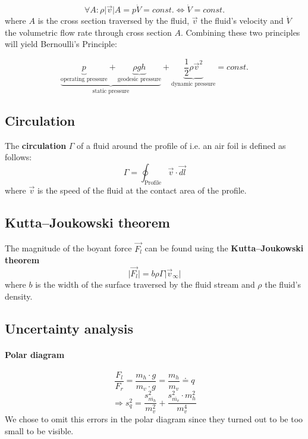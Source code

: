 \documentclass{scrreprt}
\begin{document}
\begin{equation}
\forall A : \rho \lvert \vec{v}\rvert A = p \dot{V} = const. \Longleftrightarrow \dot{V} = const.
\end{equation}
where $A$ is the cross section traversed by the fluid, $\vec{v}$ the fluid's velocity and $\dot{V}$ the volumetric flow rate through cross section $A$. Combining these two principles will yield Bernoulli's Principle:

\begin{equation}
\underbrace{\underbrace{p}_{\text{operating pressure}} + \underbrace{\rho g h}_{\text{geodesic pressure}}}_{\text{static pressure}} + \underbrace{\frac{1}{2} \rho \vec{v}^2}_{\text{dynamic pressure}} = const.
\end{equation}

\subsection{Circulation}
The \textbf{circulation} $\Gamma$ of a fluid around the profile of i.e. an air foil is defined as follows:
\begin{equation}
\Gamma = \oint_{\text{Profile}}\vec{v}\cdot\vec{dl}
\end{equation}
where $\vec{v}$ is the speed of the fluid at the contact area of the profile.

\subsection{Kutta–Joukowski theorem}
The magnitude of the boyant force $\vec{F_l}$ can be found using the \textbf{Kutta–Joukowski theorem} 
\begin{equation}
\lvert \vec{F_l}\rvert = b \rho \Gamma \lvert \vec{v}_\infty \rvert
\end{equation}
where $b$ is the width of the surface traversed by the fluid stream and $\rho$ the fluid's density.

\subsection{Uncertainty analysis}
\paragraph*{Polar diagram}
\begin{equation}
\frac{F_l}{F_r} = \frac{m_h\cdot g}{m_v\cdot g} = \frac{m_h}{m_v} \doteq q
\end{equation}
\begin{equation}
\Longrightarrow s_q^2 = \frac{s_{\overline{m_h}}^2}{m_v^2} + \frac{s_{\overline{m_v}}^2 \cdot m_h^2}{m_v^4}
\end{equation}
We chose to omit this errors in the polar diagram since they turned out to be too small to be visible.
\end{document}
